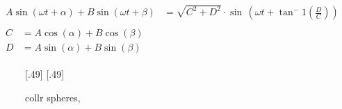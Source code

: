 \begin{align}
\begin{split}
A \sin(\omega t + \alpha) + B \sin(\omega t + \beta) &= \sqrt{C^2 + D^2} \cdot \sin \, \left( \omega t + \tan^-1 \left( \frac{D}{C} \right) \right)
\end{split}
\\
\begin{split}
C &= A \cos(\alpha)+ B \cos(\beta)\\
D &= A \sin(\alpha)+ B \sin(\beta)
\end{split} \nonumber 
\end{align}
% 
\begin{figure}[!t]
\centering
\def\tikzwidth{0.45*\textwidth}
[.49\textwidth]{
}
[.49\textwidth]{
}
\caption{collr spheres, }
\label{fig:spheres}
\end{figure}
